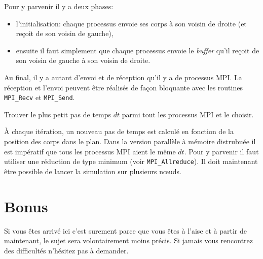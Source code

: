 \begin{questions}
\begin{solution}
		Pour y parvenir il y a deux phases:
		\begin{itemize}
			\item l'initialisation: chaque processus envoie ses corps à son voisin de droite (et reçoit de son voisin de gauche),
			\item ensuite il faut simplement que chaque processus envoie le \textit{buffer} qu'il reçoit de son voisin de gauche à son voisin de droite.
		\end{itemize}
		Au final, il y a autant d'envoi et de réception qu'il y a de processus MPI.
		La réception et l'envoi peuvent être réalisés de façon bloquante avec les routines \texttt{MPI\_Recv} et \texttt{MPI\_Send}.
	\end{solution}
	\question Trouver le plus petit pas de temps $dt$ parmi tout les processus MPI et le choisir.
	\begin{solution}
		À chaque itération, un nouveau pas de temps est calculé en fonction de la position des corps dans le plan.
		Dans la version parallèle à mémoire distrubuée il est impératif que tous les processus MPI aient le même $dt$.
		Pour y parvenir il faut utiliser une réduction de type minimum (voir \texttt{MPI\_Allreduce}).
		Il doit maintenant être possible de lancer la simulation sur plusieurs n\oe uds.
	\end{solution}
\end{questions}

\section{Bonus}
Si vous êtes arrivé ici c'est surement parce que vous êtes à l'aise et à partir de maintenant, le sujet sera volontairement moins précis.
Si jamais vous rencontrez des difficultés n'hésitez pas à demander.\\

